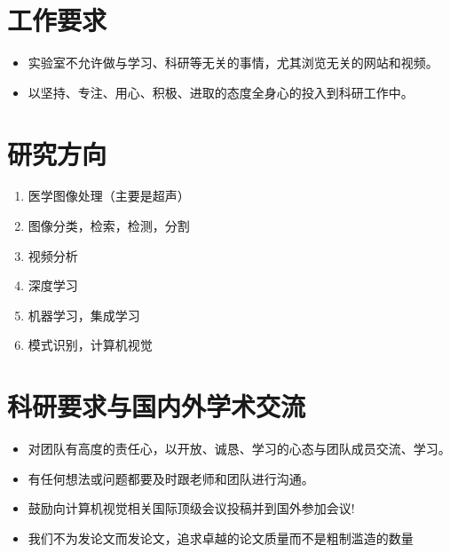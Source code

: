 \documentclass[a4paper，12pt]{article}
\begin{document}
\section{工作要求}

\begin{itemize}

\item 实验室不允许做与学习、科研等无关的事情，尤其浏览无关的网站和视频。

\item 以坚持、专注、用心、积极、进取的态度全身心的投入到科研工作中。

\end{itemize}

\section{研究方向}

\begin{enumerate}

\item 医学图像处理（主要是超声）

\item 图像分类，检索，检测，分割

\item 视频分析

\item 深度学习

\item 机器学习，集成学习

\item 模式识别，计算机视觉

\end{enumerate}

\section{科研要求与国内外学术交流}

\begin{itemize}

\item 对团队有高度的责任心，以开放、诚恳、学习的心态与团队成员交流、学习。

\item 有任何想法或问题都要及时跟老师和团队进行沟通。

\item 鼓励向计算机视觉相关国际顶级会议投稿并到国外参加会议!

\item 我们不为发论文而发论文，追求卓越的论文质量而不是粗制滥造的数量

\end{itemize}
\end{document}
